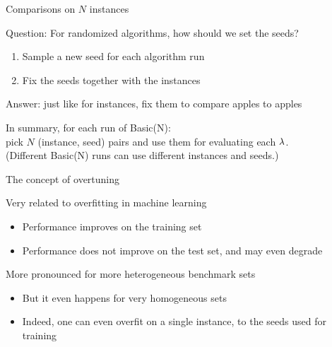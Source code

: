 \begin{frame}[c]{Comparisons on $N$ instances }

Question: For randomized algorithms, how should we set the seeds? 
\begin{enumerate}
\item Sample a new seed for each algorithm run
\item Fix the seeds together with the instances
\end{enumerate}
\bigskip
\pause
Answer: just like for instances, fix them to compare apples to apples

\bigskip
\pause
In summary, for each run of Basic(N): \\pick $N$ (instance, seed) pairs and use them for evaluating each $\mathbf{\lambda}$.\\
\pause
(Different Basic(N) runs can use different instances and seeds.)

\end{frame}


\begin{frame}[c]{The concept of overtuning}

Very related to overfitting in machine learning 
\begin{itemize}
\item Performance improves on the training set
\item Performance does not improve on the test set, and may even degrade
\end{itemize}	

\pause
\medskip

More pronounced for more heterogeneous benchmark sets 
\begin{itemize}
\item But it even happens for very homogeneous sets
\item Indeed, one can even overfit on a single instance, to the \alert{seeds} used for training 
\end{itemize}	

\end{frame}

